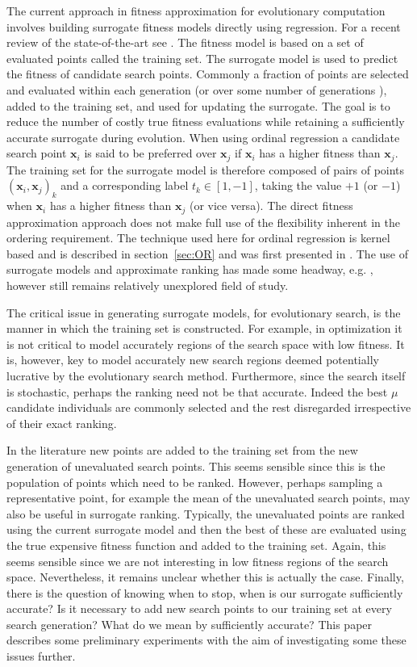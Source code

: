 \documentclass[conference]{IEEEtran}
\renewcommand{\vec}[1]{{\mbox{\boldmath$#1$}}}
\renewcommand{\vec}[1]{{\mathbf #1}}
\begin{document}
The current approach in fitness approximation for evolutionary
computation involves building surrogate fitness models directly using
regression.  For a recent review of the state-of-the-art see
\cite{Ong04,SLK05,Jin05,Lim2007}. The fitness model is based
on a set of evaluated points called the training set. The surrogate
model is used to predict the fitness of candidate search
points. Commonly a fraction of points are selected and evaluated
within each generation (or over some number of generations
\cite{JOS02}), added to the training set, and used for updating the
surrogate.  The goal is to reduce the number of costly true fitness
evaluations while retaining a sufficiently accurate surrogate during
evolution. When using ordinal regression a candidate search point
$\vec{x}_i$ is said to be preferred over $\vec{x}_j$ if $\vec{x}_i$
has a higher fitness than $\vec{x}_j$. The training set for the
surrogate model is therefore composed of pairs of points
$(\vec{x}_i,\vec{x}_j)_k$ and a corresponding label $t_k\in[1 ,-1]$,
taking the value $+1$ (or $-1$) when $\vec{x}_i$ has a higher fitness
than $\vec{x}_j$ (or vice versa).  The direct fitness approximation
approach does not make full use of the flexibility inherent in the
ordering requirement. The technique used here for ordinal regression
is kernel based and is described in section~\ref{sec:OR} and was first
presented in \cite{Ru06:PPSN}. The use of surrogate models and approximate 
ranking has made some headway, e.g. \cite{Loshchilov2010}, however still 
remains relatively unexplored field of study.

The critical issue in generating surrogate models, for evolutionary
search, is the manner in which the training set is constructed. For
example, in optimization it is not critical to model accurately regions
of the search space with low fitness. It is, however, key to model
accurately new search regions deemed potentially lucrative by the
evolutionary search method. Furthermore, since the search itself is
stochastic, perhaps the ranking need not be that accurate. Indeed the
best $\mu$ candidate individuals are commonly selected and the rest
disregarded irrespective of their exact ranking.

In the literature new points are added to the training set from the
new generation of unevaluated search points. This seems sensible since
this is the population of points which need to be ranked. However,
perhaps sampling a representative point, for example the mean of the
unevaluated search points, may also be useful in surrogate ranking.
Typically, the unevaluated points are ranked using the current
surrogate model and then the best of these are evaluated using the true
expensive fitness function and added to the training set. Again, this
seems sensible since we are not interesting in low fitness regions of
the search space. Nevertheless, it remains unclear whether this is
actually the case. Finally, there is the question of knowing when to
stop, when is our surrogate sufficiently accurate? Is it necessary to
add new search points to our training set at every search generation?
What do we mean by sufficiently accurate? This paper describes some
preliminary experiments with the aim of investigating some these issues
further.
\end{document}
